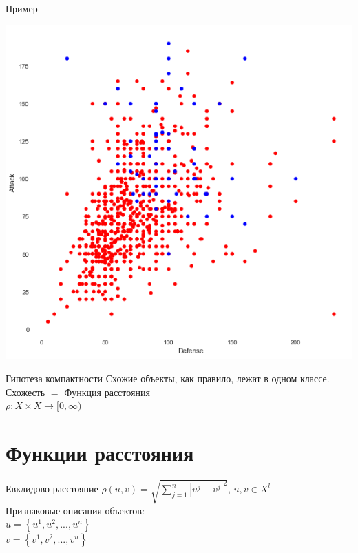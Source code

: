 \documentclass[10pt]{beamer}
\begin{document}
\begin{frame}{Пример}
  \begin{center}
    	\includegraphics[width=\linewidth,height=0.8 \textheight,keepaspectratio]{images/attack_vs_defense}  
  \end{center}    
\end{frame}

\begin{frame}{Гипотеза компактности}
  \centering
	Схожие объекты, как правило, лежат в одном классе.\\
	\bigbreak
	\alert{Схожесть} $=$ Функция расстояния\\
	\bigbreak
	${\rho: X \times X \rightarrow [0, \infty) }$
\end{frame}

\section{Функции расстояния}

{
\begin{frame}{Евклидово расстояние}
	${\rho (u, v) = \sqrt{\sum\limits_{j=1}^n |u^j - v^j|^2}}$, \hspace{5mm} ${u, v \in X^{l}}$\\
	\bigbreak
	\bigbreak
	Признаковые описания объектов:\\
	${u = \left\{ u^1, u^2, ..., u^n \right\}}$ \\
	${v = \left\{v^1, v^2, ..., v^n \right\} }$ 
\end{frame}
}
\end{document}
